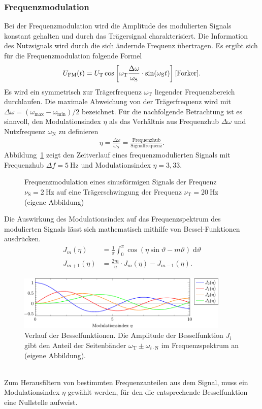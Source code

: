 \documentclass[a4paper,twoside,final]{article}
\begin{document}
\subsubsection{Frequenzmodulation}
Bei der Frequenzmodulation wird die Amplitude des modulierten Signals konstant gehalten und durch das Trägersignal charakterisiert. Die Information des Nutzsignals wird durch die sich ändernde Frequenz übertragen. Es ergibt sich für die Frequenzmodulation folgende Formel
\begin{align}
  U_\text{FM}(t) = U_\text{T} \cos\left[\omega_\text{T} \frac{\Delta \omega}{\omega_\text{S}}\cdot \sin(\omega_\text{S}t)\right] \cite{Forker}.
\end{align}
Es wird ein symmetrisch zur Trägerfrequenz $\omega_\text{T}$ liegender Frequenzbereich durchlaufen. Die maximale Abweichung von der Trägerfrequenz wird mit $\Delta \omega = (\omega_\text{max}-\omega_\text{min})/2$ bezeichnet. Für die nachfolgende Betrachtung ist es sinnvoll, den Modulationsindex $\eta$ als das Verhältnis aus Frequenzhub $\Delta \omega$ und Nutzfrequenz $\omega_\text{N}$ zu definieren
\begin{align}
  \eta = \frac{\Delta \omega}{\omega_\text{N}} = \frac{\text{Frequenzhub}}{\text{Signalfrequenz}}.
\end{align}
Abbildung~\ref{fig:FM} zeigt den Zeitverlauf eines frequenzmodulierten Signals mit Frequenzhub $\Delta f = \SI{5}{\hertz}$ und Modulationsindex $\eta = 3,33$.
\begin{figure}[htp]
    \centering
        
    \caption{Frequenzmodulation eines sinusförmigen Signals der Frequenz $\nu_\text{S} = \SI{2}{\hertz}$ auf eine Trägerschwingung der Frequenz $\nu_\text{T} = \SI{20}{\hertz}$ (eigene Abbildung)}
    \label{fig:FM}
\end{figure}
\FloatBarrier
\noindent
Die Auswirkung des Modulationsindex auf das Frequenzspektrum des modulierten Signals lässt sich mathematisch mithilfe von Bessel-Funktionen ausdrücken.
\begin{align}
    J_m(\eta) &= \frac{1}{\pi}\int_0^\pi \cos(\eta\sin \vartheta - m\vartheta)\; \text{d}\vartheta\\
    J_{m+1} (\eta) &= \frac{2m}{\eta} \cdot J_m(\eta) - J_{m-1}(\eta).
\end{align}
\begin{figure}[htp]
    \centering
    \includegraphics[width=0.9\textwidth]{Schaltungen/Besselfunktion.pdf}
    \caption{Verlauf der Besselfunktionen. Die Amplitude der Besselfunktion $J_i$ gibt den Anteil der Seitenbänder $\omega_\text{T}\pm\omega_{i\cdot\text{N}}$ im Frequenzspektrum an (eigene Abbildung).}
    \label{fig:Besselfunktionen}
\end{figure}\\
Zum Herausfiltern von bestimmten Frequenzanteilen aus dem Signal, muss ein Modulationsindex $\eta$ gewählt werden, für den die entsprechende Besselfunktion eine Nullstelle aufweist.
\newpage
\end{document}

